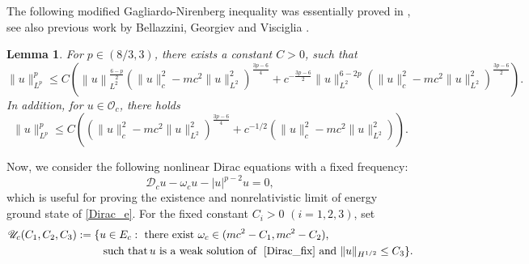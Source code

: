 \documentclass{amsart}
\theoremstyle{plain}
\newtheorem{lemma}[theorem]{Lemma}
\theoremstyle{definition}
\theoremstyle{remark}
\numberwithin{equation}{section} \numberwithin{figure}{section}
\begin{document}
The following modified Gagliardo-Nirenberg inequality
was essentially proved in \cite[Proposition 2]{MR4430585}, see also previous work by Bellazzini, Georgiev and Visciglia \cite{Bella18}.
\begin{lemma}\label{modified}
  For $p\in (8/3, 3)$, there exists a constant $C>0$, such that
  $$
  \| u\|_{L^p}^p \leq C \left( \left\|u\right\|_{L^2}^{\frac{6-p}{2}}
  (\|u\|_c^2- mc^2\|u\|_{L^2}^2)^{\frac{3p-6}{4}}
   + c^{-\frac{3p-6}{2}}\|u\|_{L^2}^{6-2p} (\|u\|_c^2- mc^2\|u\|_{L^2}^2)^{\frac{3p-6}{2}}\right).
  $$
  In addition, for $u\in \mathcal{O}_c$, there holds
  $$
  \| u\|_{L^p}^p \leq C \left( (\|u\|_c^2- mc^2\|u\|_{L^2}^2)^{\frac{3p-6}{4}} + c^{-1/2}(\|u\|_c^2- mc^2\|u\|_{L^2}^2)\right).
  $$
\end{lemma}

Now, we consider the following nonlinear Dirac equations with a fixed frequency:
 \begin{equation}\label{Dirac_fix}
  \mathscr{D}_cu  - \omega_cu-|u|^{p-2}u=0,
  \end{equation}
  which is useful for proving the existence and nonrelativistic limit of energy ground state of \eqref{Dirac_e}.
  For the fixed constant $C_i>0$ $(i=1,2,3)$, set
 \begin{equation*}
     \begin{split}
         \mathscr{U}_c(C_1, C_2, C_3):=\{&u\in E_c:
         \text{ there exist} \,\,\omega_c\in (mc^2- C_1, mc^2- C_2), \\&\text{ such that}\, u\,\, \text{is a weak solution of }\, \,\eqref{Dirac_fix}\,\, \text{and}\,\,\|u\|_{H^{1/2}}\leq C_3\}.
      \end{split}
 \end{equation*}
\end{document}
